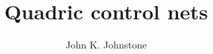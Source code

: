 \newtheorem{rmk}{Remark}[section]
\newtheorem{example}{Example}[section]
\newtheorem{conjecture}{Conjecture}[section]
\newtheorem{claim}{Claim}[section]
\newtheorem{notation}{Notation}[section]
\newtheorem{lemma}{Lemma}[section]
\newtheorem{theorem}{Theorem}[section]
\newtheorem{corollary}{Corollary}[section]
\newtheorem{defn2}{Definition}

\ifFull
\SingleSpace
\else
\DoubleSpace
\fi

\setlength{\oddsidemargin}{0pt}
\setlength{\evensidemargin}{0pt}
\setlength{\headsep}{0in}
\setlength{\topmargin}{0pt}
\setlength{\textheight}{8.75in}
\setlength{\textwidth}{6.5in}

% 

\title{Quadric control nets}
\author{John K. Johnstone}



\markright{\today \hfill}
\setlength{\headsep}{.5in}
\pagestyle{myheadings}

\maketitle


